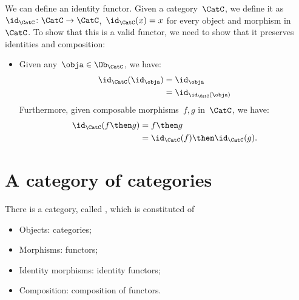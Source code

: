 We can define an identity functor. Given a category~$\CatC$, we define it as~$\id_\CatC\colon \CatC \to \CatC$,~$\id_\CatC(x)=x$ for every object and morphism in~$\CatC$. To show that this is a valid functor, we need to show that it preserves identities and composition:
\begin{itemize}
    \item Given any~$\obja \in \Ob_\CatC$, we have:
    \begin{equation*}
        \begin{aligned}
            \id_\CatC(\id_\obja)&=\id_\obja\\
            &=\id_{\id_\CatC(\obja)}
        \end{aligned}
    \end{equation*}
    Furthermore, given composable morphisms~$f,g$ in~$\CatC$, we have:
    \begin{equation*}
    \begin{aligned}
        \id_{\CatC}(f\then g)&=f\then g\\
        &=\id_{\CatC}(f)\then \id_{\CatC} (g).
    \end{aligned}
    \end{equation*}
\end{itemize}

\section{A category of categories}


\begin{ctdefinition}
  There is a category, called \Category, which is constituted of
  \begin{itemize}
    \item Objects: categories;
    \item Morphisms: functors;
    \item Identity morphisms: identity functors;
    \item Composition: composition of functors.
  \end{itemize}
\end{ctdefinition}
